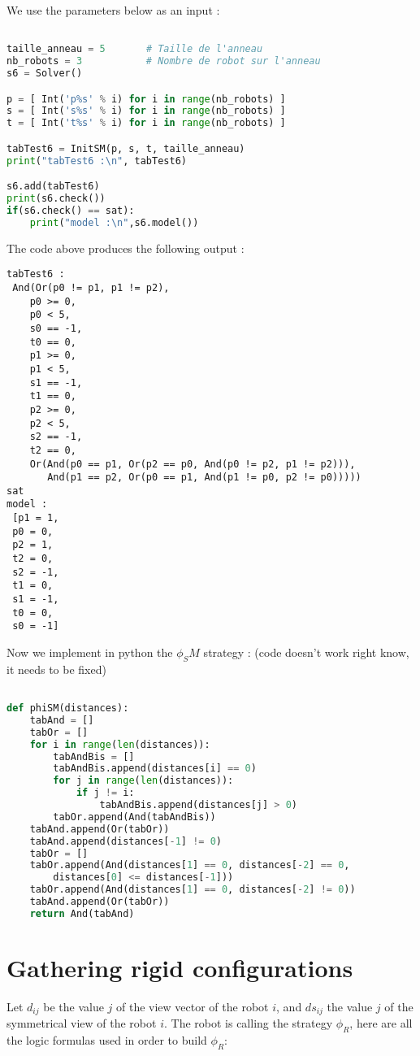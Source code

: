 \documentclass{article}
\begin{document}
We use the parameters below as an input :
\begin{lstlisting}[language=Python]

taille_anneau = 5       # Taille de l'anneau 
nb_robots = 3           # Nombre de robot sur l'anneau
s6 = Solver()

p = [ Int('p%s' % i) for i in range(nb_robots) ]
s = [ Int('s%s' % i) for i in range(nb_robots) ]
t = [ Int('t%s' % i) for i in range(nb_robots) ]

tabTest6 = InitSM(p, s, t, taille_anneau)
print("tabTest6 :\n", tabTest6)

s6.add(tabTest6)
print(s6.check())
if(s6.check() == sat):
    print("model :\n",s6.model())
\end{lstlisting}
The code above produces the following output : 
\begin{lstlisting}
tabTest6 :
 And(Or(p0 != p1, p1 != p2),
    p0 >= 0,
    p0 < 5,
    s0 == -1,
    t0 == 0,
    p1 >= 0,
    p1 < 5,
    s1 == -1,
    t1 == 0,
    p2 >= 0,
    p2 < 5,
    s2 == -1,
    t2 == 0,
    Or(And(p0 == p1, Or(p2 == p0, And(p0 != p2, p1 != p2))),
       And(p1 == p2, Or(p0 == p1, And(p1 != p0, p2 != p0)))))
sat
model :
 [p1 = 1,
 p0 = 0,
 p2 = 1,
 t2 = 0,
 s2 = -1,
 t1 = 0,
 s1 = -1,
 t0 = 0,
 s0 = -1]
\end{lstlisting}

Now we implement in python the $\phi_SM$ strategy : (code doesn't work right know, it needs to be fixed)

\begin{lstlisting}[language=Python]

def phiSM(distances):
    tabAnd = []
    tabOr = []
    for i in range(len(distances)):
        tabAndBis = []
        tabAndBis.append(distances[i] == 0)
        for j in range(len(distances)):
            if j != i:
                tabAndBis.append(distances[j] > 0)
        tabOr.append(And(tabAndBis))
    tabAnd.append(Or(tabOr))
    tabAnd.append(distances[-1] != 0)
    tabOr = []
    tabOr.append(And(distances[1] == 0, distances[-2] == 0,
        distances[0] <= distances[-1]))
    tabOr.append(And(distances[1] == 0, distances[-2] != 0))
    tabAnd.append(Or(tabOr))
    return And(tabAnd)
\end{lstlisting}

\section{Gathering rigid configurations}

Let $d_{ij}$ be the value $j$ of the view vector of the robot $i$, and $ds_{ij}$ the value $j$ of the symmetrical 
view of the robot $i$.
The robot is calling the strategy $\phi_R$, here are all the logic formulas used in order to build $\phi_R$:
\end{document}
